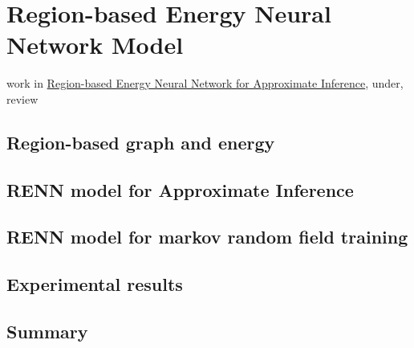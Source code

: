\chapter{Region-based Energy Neural Network Model}
work in \href{https://github.com/FirstHandScientist/paper_renn}{Region-based Energy Neural Network for Approximate Inference}, under, review
\section{Region-based graph and energy}

\section{RENN model for Approximate Inference}

\section{RENN model for markov random field training}

\section{Experimental results}

\section{Summary}
